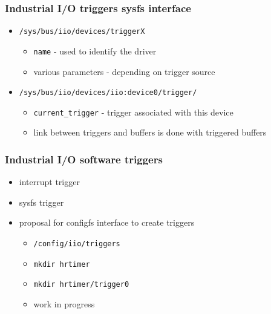 \documentclass[aspectratio=169]{beamer}
\begin{document}
\begin{frame}
\frametitle{Industrial I/O triggers sysfs interface}
\begin{itemize}
    \item \texttt{/sys/bus/iio/devices/triggerX}
    \begin{itemize}
        \item \texttt{name} - used to identify the driver
        \item various parameters - depending on trigger source
    \end{itemize}
    \item \texttt{/sys/bus/iio/devices/iio:device0/trigger/}
    \begin{itemize}
        \item \texttt{current\_trigger} - trigger associated with this device
        \item link between triggers and buffers is done with triggered buffers
    \end{itemize}
\end{itemize}
\end{frame}


\begin{frame}
\frametitle{Industrial I/O software triggers}
\begin{itemize}
    \item interrupt trigger
    \item sysfs trigger
    \item proposal for configfs interface to create triggers
    \begin{itemize}
        \item \texttt{/config/iio/triggers}
        \item \texttt{mkdir hrtimer}
        \item \texttt{mkdir hrtimer/trigger0}
        \item work in progress
    \end{itemize}
\end{itemize}
\end{frame}

\end{document}
